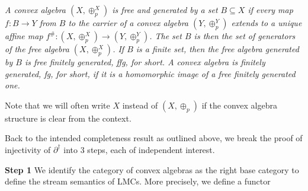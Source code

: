 \documentclass[11pt,a4paper]{amsart}
\begin{document}
\hypertarget{html:S4.Thmtheorem1.p2}{} \emph{A convex algebra %
\hypertarget{html:S4.Thmtheorem1.p2.m1}{}\({(X,\oplus^{X}_{p})}\) is \emph{free} and generated by a set %
\hypertarget{html:S4.Thmtheorem1.p2.m2}{}\({B\subseteq X}\) if every map %
\hypertarget{html:S4.Thmtheorem1.p2.m3}{}\({f\colon B\to Y}\) from %
\hypertarget{html:S4.Thmtheorem1.p2.m4}{}\({B}\) to the carrier of a convex algebra %
\hypertarget{html:S4.Thmtheorem1.p2.m5}{}\({(Y,\oplus^{Y}_{p})}\) extends to a unique affine map %
\hypertarget{html:S4.Thmtheorem1.p2.m6}{}\({f^{\#}\colon(X,\oplus^{X}_{p})\to(Y,\oplus^{Y}_{p})}\). The set %
\hypertarget{html:S4.Thmtheorem1.p2.m7}{}\({B}\) is then the set of generators of the free algebra %
\hypertarget{html:S4.Thmtheorem1.p2.m8}{}\({(X,\oplus^{X}_{p})}\). If %
\hypertarget{html:S4.Thmtheorem1.p2.m9}{}\({B}\) is a finite set, then the free algebra generated by %
\hypertarget{html:S4.Thmtheorem1.p2.m10}{}\({B}\) is \emph{free finitely generated}, \emph{ffg}, for short. A convex algebra is \emph{finitely generated}, \emph{fg}, for short, if it is a homomorphic image of a free finitely generated one.}
\par\medskip
\hypertarget{html:S4.p2}{} Note that we will often write %
\hypertarget{html:S4.p2.m1}{}\({X}\) instead of %
\hypertarget{html:S4.p2.m2}{}\({(X,\oplus_{p})}\) if the convex algebra structure is clear from the context.
\par\medskip
\hypertarget{html:S4.p3}{} Back to the intended completeness result as outlined above, we break the proof of injectivity of %
\hypertarget{html:S4.p3.m1}{}\({\partial^{\dagger}}\) into 3 steps, each of independent interest.
\par\medskip
\hypertarget{html:S4.SS0.SSSx1}{} \par\noindent\textbf{Step 1}\quad  %
\hypertarget{html:S4.SS0.SSSx1.p1}{} We identify the category of convex algebras as the right base category to define the stream semantics of LMCs. More precisely, we define a functor %
\end{document}
